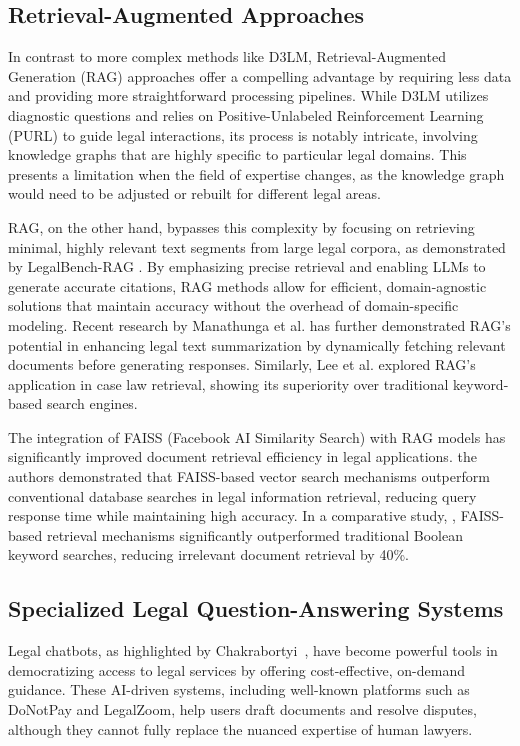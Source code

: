\subsection{Retrieval-Augmented Approaches}
In contrast to more complex methods like D3LM, Retrieval-Augmented Generation 
(RAG) approaches offer a compelling advantage by requiring less data and 
providing more straightforward processing pipelines. While D3LM utilizes 
diagnostic questions and relies on Positive-Unlabeled Reinforcement Learning 
(PURL) to guide legal interactions, its process is notably intricate, 
involving knowledge graphs that are highly specific to particular 
legal domains. This presents a limitation when the field of expertise changes, 
as the knowledge graph would need to be adjusted or rebuilt for different legal 
areas.

RAG, on the other hand, bypasses this complexity by focusing on retrieving 
minimal, highly relevant text segments from large legal corpora, as 
demonstrated by LegalBench-RAG \cite{pipitone2024legalbenchragbenchmarkretrievalaugmentedgeneration}. 
By emphasizing precise retrieval and enabling LLMs to generate accurate 
citations, RAG methods allow for efficient, domain-agnostic solutions that 
maintain accuracy without the overhead of domain-specific modeling. Recent 
research by Manathunga et al. \cite{manathunga2023retrievalaugmentedgenerationrepresentative} has 
further demonstrated RAG's potential in enhancing legal text summarization by dynamically 
fetching relevant documents before generating responses. Similarly, 
Lee et al. \cite{ryu-etal-2023-retrieval} explored RAG's application in case 
law retrieval, showing its superiority over traditional keyword-based search 
engines.

The integration of FAISS (Facebook AI Similarity Search) with RAG models has 
significantly improved document retrieval efficiency in legal applications. 
\cite{panchal2025lawpalretrievalaugmented} the authors demonstrated that FAISS-based vector 
search mechanisms outperform conventional database searches in legal 
information retrieval, reducing query response time while maintaining high accuracy. 
In a comparative study, \cite{zeng2023scalableeffectivegenerativeinformation}, FAISS-based 
retrieval mechanisms significantly outperformed traditional Boolean keyword searches, 
reducing irrelevant document retrieval by 40\%.

\subsection{Specialized Legal Question-Answering Systems}
Legal chatbots, as highlighted by Chakrabortyi~\cite{chakraborty2023revolutionizing}, 
have become powerful tools in democratizing access to legal services by 
offering cost-effective, on-demand guidance. These AI-driven systems, 
including well-known platforms such as DoNotPay and LegalZoom, 
help users draft documents and resolve disputes, although they cannot 
fully replace the nuanced expertise of human lawyers.

